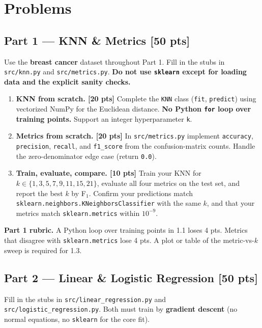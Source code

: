 \documentclass[11pt,a4paper]{article}
\newcommand{\points}[1]{\textcolor{accent}{\textbf{[#1 pts]}}}
\begin{document}
\section{Problems}

\subsection{Part 1 --- KNN \& Metrics \points{50}}\label{sec:p1}
Use the \textbf{breast cancer} dataset throughout Part 1. Fill in the stubs in \texttt{src/knn.py} and \texttt{src/metrics.py}. \textbf{Do not use \texttt{sklearn} except for loading data and the explicit sanity checks.}

\begin{enumerate}[label=\textbf{1.\arabic*},leftmargin=2.4em,itemsep=4pt]
  \item \textbf{KNN from scratch. \points{20}} Complete the \texttt{KNN} class (\texttt{fit}, \texttt{predict}) using vectorized NumPy for the Euclidean distance. \textbf{No Python \texttt{for} loop over training points.} Support an integer hyperparameter \texttt{k}.

  \item \textbf{Metrics from scratch. \points{20}} In \texttt{src/metrics.py} implement \texttt{accuracy}, \texttt{precision}, \texttt{recall}, and \texttt{f1\_score} from the confusion-matrix counts. Handle the zero-denominator edge case (return \texttt{0.0}).

  \item \textbf{Train, evaluate, compare. \points{10}} Train your KNN for $k\in\{1,3,5,7,9,11,15,21\}$, evaluate all four metrics on the test set, and report the best $k$ by F$_1$. Confirm your predictions match \texttt{sklearn.neighbors.KNeighborsClassifier} with the same $k$, and that your metrics match \texttt{sklearn.metrics} within $10^{-9}$.
\end{enumerate}

\begin{rubricbox}
\textbf{Part 1 rubric.} A Python loop over training points in 1.1 loses 4 pts. Metrics that disagree with \texttt{sklearn.metrics} lose 4 pts. A plot or table of the metric-vs-$k$ sweep is required for 1.3.
\end{rubricbox}

\subsection{Part 2 --- Linear \& Logistic Regression \points{50}}\label{sec:p2}
Fill in the stubs in \texttt{src/linear\_regression.py} and \texttt{src/logistic\_regression.py}. Both must train by \textbf{gradient descent} (no normal equations, no \texttt{sklearn} for the core fit).
\end{document}
